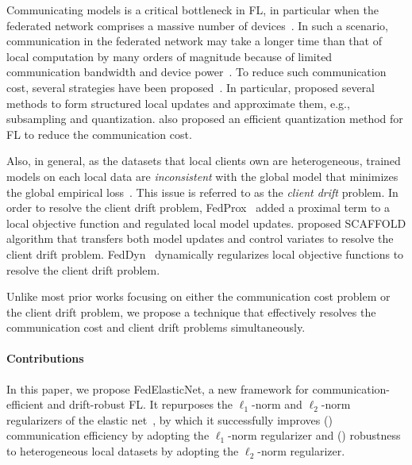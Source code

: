 \documentclass{article} %
\begin{document}
Communicating models is a critical bottleneck in FL, in particular when the federated network comprises a massive number of devices~\citep{Bonawitz2019towards,Li2020federatedlearning,Konevcny2016federatedlearning}. In such a scenario, communication in the federated network may take a longer time than that of local computation by many orders of magnitude because of limited communication bandwidth and device power~\citep{Li2020federatedlearning}. To reduce such communication cost, several strategies have been proposed~\citep{Konevcny2016federatedlearning,Li2020federatedlearning}. In particular, \citet{Konevcny2016federatedlearning} proposed several methods to form structured local updates and approximate them, e.g., subsampling and quantization. \citet{Reisizadeh2020fedpaq,Xu2020ternary} also proposed an efficient quantization method for FL to reduce the communication cost. 


Also, in general, as the datasets that local clients own are heterogeneous, trained models on each local data are \emph{inconsistent} with the global model that minimizes the global empirical loss~\citep{Karimireddy2020scaffold,Malinovskiy2020local,Acar2021federated}. This issue is referred to as the \emph{client drift} problem. In order to resolve the client drift problem, FedProx~\citep{Li2020federated} added a proximal term to a local objective function and regulated local model updates. \citet{Karimireddy2020scaffold} proposed SCAFFOLD algorithm that transfers both model updates and control variates to resolve the client drift problem. FedDyn~\citep{Acar2021federated} dynamically regularizes local objective functions to resolve the client drift problem. 

Unlike most prior works focusing on either the communication cost problem or the client drift problem, we propose a technique that effectively resolves the communication cost and client drift problems simultaneously.

\paragraph{Contributions}

In this paper, we propose FedElasticNet, a new framework for communication-efficient and drift-robust FL. It repurposes the $\ell_1$-norm and $\ell_2$-norm regularizers of the elastic net~\citep{Zou2005regularization}, by which it successfully improves ({}) communication efficiency by adopting the $\ell_1$-norm regularizer and ({}) robustness to heterogeneous local datasets by adopting the $\ell_2$-norm regularizer.
\end{document}
